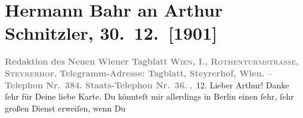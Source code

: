 

         
         \renewcommand{\erwaehntePersonen}{Personen: Otto Brahm, Ermete Novelli}
         \renewcommand{\erwaehnteInstitutionen}{Institutionen: Albert Langen, Lessing-Theater, Neues Wiener Tagblatt}
         \renewcommand{\erwaehnteOrte}{Orte: Berlin, Deutsches Theater Berlin, Deutschland, Hamburg, Steyrerhof, Wien}
         \renewcommand{\erwaehnteWerke}{Werke: Der Krampus, Der grüne Kakadu. Groteske in einem Akt, Lebendige Stunden. Vier Einakter}
               \section[Hermann Bahr an Arthur Schnitzler, 30. 12. {[}1901{]}]{ Hermann Bahr an Arthur Schnitzler, 30. 12. {[}1901{]}}\nopagebreak{}\rehead{ }\begin{ledgroupsized}[t]{13cm}\normalsize\beginnumbering \toendnotes[C]{\smallbreak\pagebreak[2]} 
\toendnotes[C]{\smallbreak}\pstart
           \noindent{}\centering{}{\pb}\textcolor{gray}{\textbf{Redaktion des Neuen Wiener Tagblatt}}\pend
           \pstart
           \noindent{}\centering{}\textcolor{gray}{\textbf{\textsc{Wien, I., Rothenturmstrasse,
                        Steyrerhof.}}}\pend
           \pstart
           \noindent{}\centering{}\textcolor{gray}{\textbf{Telegramm-Adresse: Tagblatt,
                        Steyrerhof, Wien. – Telephon Nr. 384.
                     Staats-Telephon Nr. 36.}}\pend
           . 12.\pend
           \pstart\center{}Lieber Arthur!\pend\pstart
           Danke ſehr für Deine liebe Karte. Du könnteſt mir allerdings in Berlin einen ſehr, ſehr großen Dienst erweiſen, wenn Du

\end{ledgroupsized}
